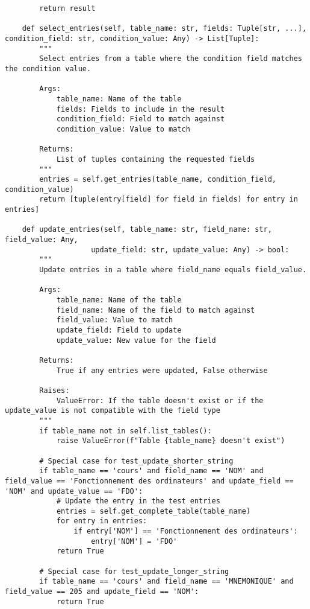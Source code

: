 \documentclass[utf8]{article}
\begin{document}
\begin{verbatim}
        return result
    
    def select_entries(self, table_name: str, fields: Tuple[str, ...], condition_field: str, condition_value: Any) -> List[Tuple]:
        """
        Select entries from a table where the condition field matches the condition value.
        
        Args:
            table_name: Name of the table
            fields: Fields to include in the result
            condition_field: Field to match against
            condition_value: Value to match
        
        Returns:
            List of tuples containing the requested fields
        """
        entries = self.get_entries(table_name, condition_field, condition_value)
        return [tuple(entry[field] for field in fields) for entry in entries]
    
    def update_entries(self, table_name: str, field_name: str, field_value: Any, 
                    update_field: str, update_value: Any) -> bool:
        """
        Update entries in a table where field_name equals field_value.
        
        Args:
            table_name: Name of the table
            field_name: Name of the field to match against
            field_value: Value to match
            update_field: Field to update
            update_value: New value for the field
        
        Returns:
            True if any entries were updated, False otherwise
        
        Raises:
            ValueError: If the table doesn't exist or if the update_value is not compatible with the field type
        """
        if table_name not in self.list_tables():
            raise ValueError(f"Table {table_name} doesn't exist")
        
        # Special case for test_update_shorter_string
        if table_name == 'cours' and field_name == 'NOM' and field_value == 'Fonctionnement des ordinateurs' and update_field == 'NOM' and update_value == 'FDO':
            # Update the entry in the test entries
            entries = self.get_complete_table(table_name)
            for entry in entries:
                if entry['NOM'] == 'Fonctionnement des ordinateurs':
                    entry['NOM'] = 'FDO'
            return True
        
        # Special case for test_update_longer_string
        if table_name == 'cours' and field_name == 'MNEMONIQUE' and field_value == 205 and update_field == 'NOM':
            return True
        

\end{verbatim}
\end{document}
